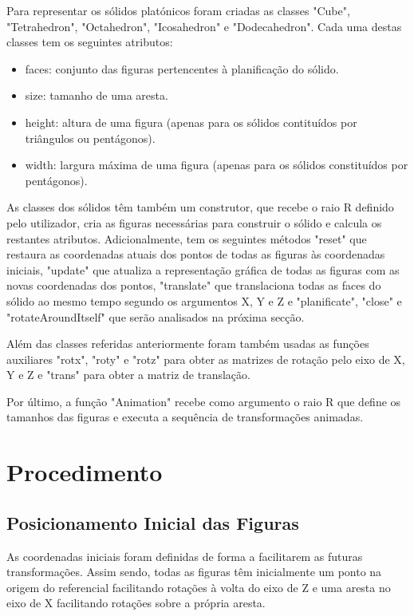 \documentclass{report}
\begin{document}
Para representar os sólidos platónicos foram criadas as classes "Cube", "Tetrahedron", "Octahedron", "Icosahedron" e "Dodecahedron". Cada uma destas classes tem os seguintes atributos:
\begin{itemize}
    \setlength\itemsep{0.1em}
    \item faces: conjunto das figuras pertencentes à planificação do sólido.
    \item size: tamanho de uma aresta.
    \item height: altura de uma figura (apenas para os sólidos contituídos por triângulos ou pentágonos).
    \item width: largura máxima de uma figura (apenas para os sólidos constituídos por pentágonos).
\end{itemize}

As classes dos sólidos têm também um construtor, que recebe o raio R definido pelo utilizador, cria as figuras necessárias para construir o sólido e calcula os restantes atributos. Adicionalmente, tem os seguintes métodos "reset" que restaura as coordenadas atuais dos pontos de todas as figuras às coordenadas iniciais, "update" que atualiza a representação gráfica de todas as figuras com as novas coordenadas dos pontos, "translate" que translaciona todas as faces do sólido ao mesmo tempo segundo os argumentos X, Y e Z e "planificate", "close" e "rotateAroundItself" que serão analisados na próxima secção.

Além das classes referidas anteriormente foram também usadas as funções auxiliares "rotx", "roty" e "rotz" para obter as matrizes de rotação pelo eixo de X, Y e Z e "trans" para obter a matriz de translação.

Por último, a função "Animation" recebe como argumento o raio R que define os tamanhos das figuras e executa a sequência de transformações animadas.

\section{Procedimento}

\subsection{Posicionamento Inicial das Figuras}

\quad As coordenadas iniciais foram definidas de forma a facilitarem as futuras transformações. Assim sendo, todas as figuras têm inicialmente um ponto na origem do referencial facilitando rotações à volta do eixo de Z e uma aresta no eixo de X facilitando rotações sobre a própria aresta.
\end{document}
